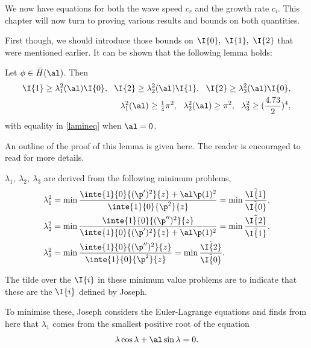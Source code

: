 We now have equations for both the wave speed $ c_r $ and the growth rate $ c_i $. This chapter will now turn to proving various results and bounds on both quantities.

First though, we should introduce those bounds on $ \I{0},\ \I{1},\ \I{2} $ that were mentioned earlier. It can be shown that the following lemma holds:

\begin{lemma}
Let $ \phi \in \Bar{H}(\al) $. Then
\begin{subequations}
\begin{align}
    \I{1} \geq \lambda^2_1(\al) \I{0} ,\ \ \I{2} \geq \lambda^2_2(\al) \I{1},\ \ \I{2} \geq \lambda^2_3 (\al) \I{0}, \label{jineq1} \\ 
    \lambda^2_1(\al) \geq \tfrac{1}{4} \pi^2 ,\ \ \lambda^2_2(\al) \geq \pi^2, \ \ \lambda^2_3 \geq (\frac{4.73}{2})^4,  \label{jineq2}
\end{align}
\label{lamineq}
\end{subequations}
with equality in \eqref{lamineq} when $ \al = 0 $.
\label{josephlemma}
\end{lemma}

\proof An outline of the proof of this lemma is given here. The reader is encouraged to read \citet{joseph1969eigenvalue} for more details. 

$ \lambda_1,\ \lambda_2,\ \lambda_3$ are derived from the following minimum problems,
\begin{align}
    \lambda_1^2 &= \min \frac{\inte{1}{0}{(\p')^2}{z} + \al \p(1)^2}{\inte{1}{0}{\p^2}{z}} = \min \frac{\Tilde{\I{1}}}{\Tilde{\I{0}}}, \\
    \lambda_2^2 &= \min \frac{\inte{1}{0}{(\p'')^2}{z} }{\inte{1}{0}{(\p')^2}{z}  + \al \p(1)^2} = \min \frac{\Tilde{\I{2}}}{\Tilde{\I{1}}}, \\
    \lambda_3^2 &= \min \frac{\inte{1}{0}{(\p'')^2}{z} }{\inte{1}{0}{\p^2}{z}} = \min 
 \frac{\Tilde{\I{2}}}{\Tilde{\I{0}}}.
 \label{minimumproblems}
\end{align}

The tilde over the $ \I{i}$ in these minimum value problems are to indicate that these are the $ \I{i}$ defined by Joseph.

To minimise these, Joseph considers the Euler-Lagrange equations and finds from here that $ \lambda_1 $ comes from the smallest positive root of the equation 
\begin{equation}
    \lambda \cos \lambda + \al \sin \lambda = 0.
\end{equation}

